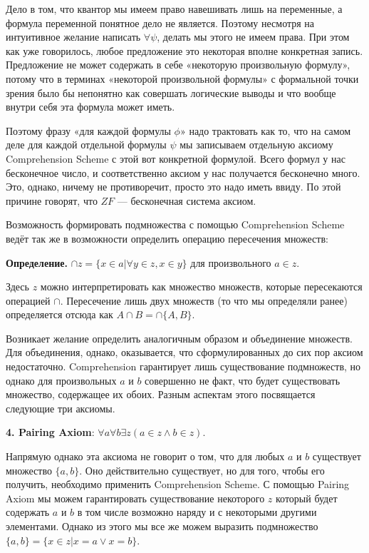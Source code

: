 Дело в том, что квантор мы имеем право навешивать лишь на переменные, а формула переменной понятное дело не является. Поэтому несмотря на интуитивное желание написать $\forall\psi$, делать мы этого не имеем права. При этом как уже говорилось, любое предложение это некоторая вполне конкретная запись. Предложение не может содержать в себе «некоторую произвольную формулу», потому что в терминах «некоторой произвольной формулы» с формальной точки зрения было бы непонятно как совершать логические выводы и что вообще внутри себя эта формула может иметь.

Поэтому фразу «для каждой формулы $\phi$» надо трактовать как то, что на самом деле для каждой отдельной формулы $\psi$ мы записываем отдельную аксиому Comprehension Scheme с этой вот конкретной формулой. Всего формул у нас бесконечное число, и соответственно аксиом у нас получается бесконечно много. Это, однако, ничему не противоречит, просто это надо иметь ввиду. По этой причине говорят, что $ZF$ — бесконечная система аксиом.

Возможность формировать подмножества с помощью Comprehension Scheme ведёт так же в возможности определить операцию пересечения множеств:

{\bfseries Определение. }$\cap z = \{x \in a| \forall y \in z, x\in y\}$ для произвольного $a \in z$.

Здесь $z$ можно интерпретировать как множество множеств, которые пересекаются операцией $\cap$. Пересечение лишь двух множеств (то что мы определяли ранее) определяется отсюда как $A\cap B = \cap\{A, B\}$.

Возникает желание определить аналогичным образом и объединение множеств. Для объединения, однако, оказывается, что сформулированных до сих пор аксиом недостаточно. Comprehension гарантирует лишь существование подмножеств, но однако для произвольных $a$ и $b$ совершенно не факт, что будет существовать множество, содержащее их обоих. Разным аспектам этого посвящается следующие три аксиомы.

{\bfseries 4. Pairing Axiom}: $\forall a \forall b \exists z (a\in z \wedge b \in z)$.

Напрямую однако эта аксиома не говорит о том, что для любых $a$ и $b$ существует множество $\{a, b\}$. Оно действительно существует, но для того, чтобы его получить, необходимо применить Comprehension Scheme. С помощью Pairing Axiom мы можем гарантировать существование некоторого $z$ который будет содержать $a$ и $b$ в том числе возможно наряду и с некоторыми другими элементами. Однако из этого мы все же можем выразить подмножество $\{a, b\} = \{x \in z| x = a \vee x = b\}$.

